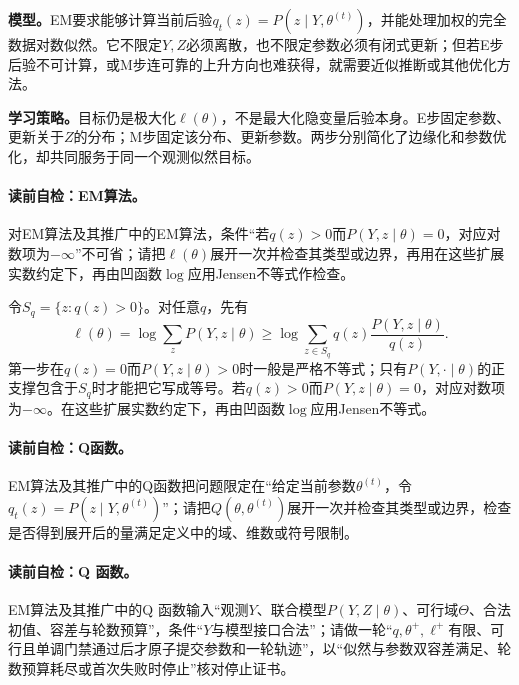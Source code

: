 \label{struct:V3-C04-CH08}
\textbf{模型。}EM要求能够计算当前后验$q_t(z)=P(z\mid Y,\theta^{(t)})$，并能处理加权的完全数据对数似然。它不限定$Y,Z$必须离散，也不限定参数必须有闭式更新；但若E步后验不可计算，或M步连可靠的上升方向也难获得，就需要近似推断或其他优化方法。

\label{struct:V3-C04-CH09}
\textbf{学习策略。}目标仍是极大化$\ell(\theta)$，不是最大化隐变量后验本身。E步固定参数、更新关于$Z$的分布；M步固定该分布、更新参数。两步分别简化了边缘化和参数优化，却共同服务于同一个观测似然目标。


\paragraph{读前自检：EM算法。}对EM算法及其推广中的EM算法，条件“若$q(z)>0$而$P(Y,z\mid\theta)=0$，对应对数项为$-\infty$”不可省；请把$\ell(\theta)$展开一次并检查其类型或边界，再用在这些扩展实数约定下，再由凹函数$\log$应用Jensen不等式作检查。\par

令$S_q=\{z:q(z)>0\}$。对任意$q$，先有
\[
\ell(\theta)=\log\sum_zP(Y,z\mid\theta)
\geq\log\sum_{z\in S_q}q(z)\frac{P(Y,z\mid\theta)}{q(z)}.
\]
第一步在$q(z)=0$而$P(Y,z\mid\theta)>0$时一般是严格不等式；只有$P(Y,\cdot\mid\theta)$的正支撑包含于$S_q$时才能把它写成等号。若$q(z)>0$而$P(Y,z\mid\theta)=0$，对应对数项为$-\infty$。在这些扩展实数约定下，再由凹函数$\log$应用Jensen不等式。

\paragraph{读前自检：Q函数。}EM算法及其推广中的Q函数把问题限定在“给定当前参数$\theta^{(t)}$，令$q_t(z)=P(z\mid Y,\theta^{(t)})$”；请把$Q(\theta,\theta^{(t)})$展开一次并检查其类型或边界，检查是否得到展开后的量满足定义中的域、维数或符号限制。\par

\paragraph{读前自检：Q 函数。}EM算法及其推广中的Q 函数输入“观测$Y$、联合模型$P(Y,Z\mid\theta)$、可行域$\Theta$、合法初值、容差与轮数预算”，条件“$Y$与模型接口合法”；请做一轮“$q,\theta^+,\ell^+$有限、可行且单调门禁通过后才原子提交参数和一轮轨迹”，以“似然与参数双容差满足、轮数预算耗尽或首次失败时停止”核对停止证书。\par

